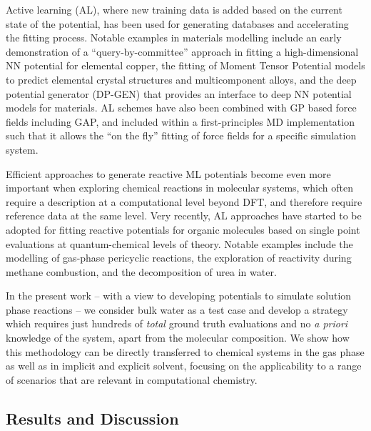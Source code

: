 \documentclass[../../main.tex]{subfiles}
\begin{document}
Active learning (AL), where new training data is added based on the current state of the potential, has been used for generating databases and accelerating the fitting process.\cite{Sivaraman2020, Podryabinkin2019, Artrith2012, Gubaev2019, Yang2021, Smith2018} Notable examples in materials modelling include an early demonstration of a “query-by-committee” approach in fitting a high-dimensional NN potential for elemental copper,\cite{Artrith2012} the fitting of Moment Tensor Potential\cite{Shapeev2016} models\cite{Podryabinkin2017} to predict elemental crystal structures\cite{Podryabinkin2019} and multicomponent alloys,\cite{Gubaev2019} and the deep potential generator (DP-GEN)\cite{Zhang2019, Zhang2020dpgen} that provides an interface to deep NN potential models for materials.\cite{Zhang2018} AL schemes have also been combined with GP based force fields including GAP,\cite{Vandermause2020} and included within a first-principles MD implementation such that it allows the “on the fly” fitting of force fields for a specific simulation system.\cite{Jinnouchi2019, Jinnouchi2020}

Efficient approaches to generate reactive ML potentials become even more important when exploring chemical reactions in molecular systems, which often require a description at a computational level beyond DFT, and therefore require reference data at the same level. Very recently, AL approaches have started to be adopted for fitting reactive potentials for organic molecules based on single point evaluations at quantum-chemical levels of theory. Notable examples include the modelling of gas-phase pericyclic reactions,\cite{Ang2021} the exploration of reactivity during methane combustion,\cite{Zeng2020} and the decomposition of urea in water.\cite{Yang2021}

In the present work – with a view to developing potentials to simulate solution phase reactions – we consider bulk water as a test case and develop a strategy which requires just hundreds of \emph{total} ground truth evaluations and no \emph{a priori} knowledge of the system, apart from the molecular composition. We show how this methodology can be directly transferred to chemical systems in the gas phase as well as in implicit and explicit solvent, focusing on the applicability to a range of scenarios that are relevant in computational chemistry.


\subsection{Results and Discussion}
\end{document}
